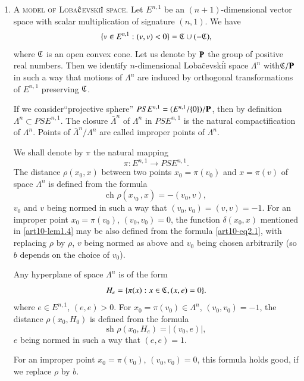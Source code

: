 \begin{enumerate}
\item A \textsc{model of Loba$\hat{\textsc{c}}$evski$\hat{\textsc{i}}$ space.} Let $E^{n,1}$ be an $(n+1)$-dimensional vector space with scalar multiplication of signature $(n,1)$. We have
$$
\{v \in E^{n,1}: (v, v) < 0\} = \mathfrak{C} \cup (-\mathfrak{C}),
$$
where $\mathfrak{C}$ is an open convex cone. Let us denote by $\mathbf{P}$ the group of positive real numbers. Then we identify $n$-dimensional Loba$\hat{\text{c}}$evski$\hat{\text{i}}$ space $\Lambda^n$ with$\mathfrak{C}/\mathbf{P}$ in such a way that motions of $\Lambda^n$ are induced by orthogonal transformations of $E^{n,1}$ preserving $\mathfrak{C}$.

If we consider\pageoriginale ``projective sphere'' $PSE^{n,1} = (E^{n,1} / \{0\})/ \mathbf{P}$, then by definition $\Lambda^n \subset PSE^{n,1}$. The closure $\bar{\Lambda}^n$ of $\Lambda^n$ in $PSE^{n,1}$ is the natural compactification of $\Lambda^n$. Points of $\bar{\Lambda}^n/ \Lambda^n$ are called improper points of $\Lambda^n$.

We shall denote by $\pi$ the natural mapping 
$$
\pi : E^{n,1} \to PSE^{n,1}.
$$
The distance $\rho (x_0, x)$ between two points $x_0 = \pi (v_0)$ and $x = \pi (v)$ of space $\Lambda^n$ is defined from the  formula
\setcounter{equation}{0}
\begin{equation}
\text{ch } \rho (x,_0 , x) = - (v_0, v), \label{art10-eq2.1}
\end{equation}
$v_0$ and $v$ being normed in such a way that $(v_0, v_0) = (v,v) = -1$. For an improper point $x_0 = \pi (v_0)$, $(v_0, v_0) =0$, the function $\delta (x_0, x)$ mentioned in \ref{art10-lem1.4} may be also defined from the formula \eqref{art10-eq2.1}, with replacing $\rho$ by $\rho$, $v$ being normed as above and $v_0$ being chosen arbitrarily (so $b$ depends on the choice of $v_0$).

Any hyperplane of space $\Lambda^n$ is of the form 
$$
H_e = \{\pi (x) : x \in \mathfrak{C}, (x, e) = 0\}.
$$
where $e \in E^{n,1}$, $(e,e) >0$. For $x_0 = \pi (v_0) \in \Lambda^n$, $(v_0, v_0) = - 1$, the distance $\rho (x_0, H_0)$ is defined from the formula
\begin{equation}
\text{sh } \rho (x_0, H_e) = \left| (v_0, e)\right|, \label{art10-eq2.2}
\end{equation}
$e$ being normed in such a way that $(e,e) =1$.

For an improper point $x_0 = \pi (v_0)$, $(v_0, v_0) =0$, this formula holds good, if we replace $\rho$ by $b$.


\end{enumerate}
